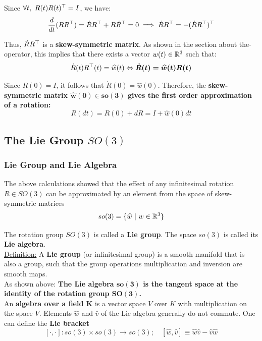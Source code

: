 Since $\forall t,\ R(t)R(t)^{\top} = I$, we have:
	\[\frac{d}{dt}(RR^{\top}) = \dot{R}R^{\top} + R\dot{R}^{\top}= 0
	\implies \dot{R}R^{\top} = -( \dot{R}R^{\top} )^{\top}\]

Thus, $\dot{R}R^{\top}$ is a \textbf{skew-symmetric matrix}.
As shown in the section about the $\widehat{}$ operator, this implies that
there exists a vector $w(t) \in \mathbb{R}^3$ such that:
	\[\dot{R}(t)R^{\top}(t) = \widehat{w}(t)
	\Leftrightarrow \bm{ \dot{R}(t) = \widehat{w}(t)R(t)}\]

Since $R(0) = I$, it follows that $\dot{R}(0) = \widehat{w}(0)$.
Therefore, the \textbf{skew-symmetric matrix $\bm{\widehat{w}(0) \in so(3)}$
gives the first order approximation of a rotation:}
	\[R(dt) = R(0) + dR = I + \widehat{w}(0) dt\]


\subsection{The Lie Group $SO(3)$}%
\label{sub:the_lie_group_so_3_}


\subsubsection{Lie Group and Lie Algebra}%
\label{ssub:lie_group_and_lie_algebra}

The above calculations showed that the effect of any infinitesimal
rotation $R \in SO(3)$ can be approximated by an element from
the space of skew-symmetric matrices
	\[so(3) = \{ \widehat{w}\ |\ w \in \mathbb{R}^3\}\]

The rotation group $SO(3)$ is called a \textbf{Lie group}.
The space $so(3)$ is called its \textbf{Lie algebra}.\\

\underline{Definition:}
A \textbf{Lie group} (or infinitesimal group) is a smooth manifold that
is also a group, such that the group operations multiplication
and inversion are smooth maps.\\

As shown above: \textbf{The Lie algebra $\bm{so(3)}$ is the tangent space
at the identity of the rotation group $\bm{SO(3)}$.}\\

An \textbf{algebra over a field $\bm{K}$} is a vector space $V$ over $K$
with multiplication on the space $V$.
Elements $\widehat{w}$ and $\widehat{v}$ of the Lie algebra
generally do not commute.
One can define the \textbf{Lie bracket}
\[[\cdot,\cdot]: so(3) \times so(3) \rightarrow so(3);\quad
[\widehat{w},\widehat{v}] \equiv \widehat{w}\widehat{v} - \widehat{v}\widehat{w}\]


